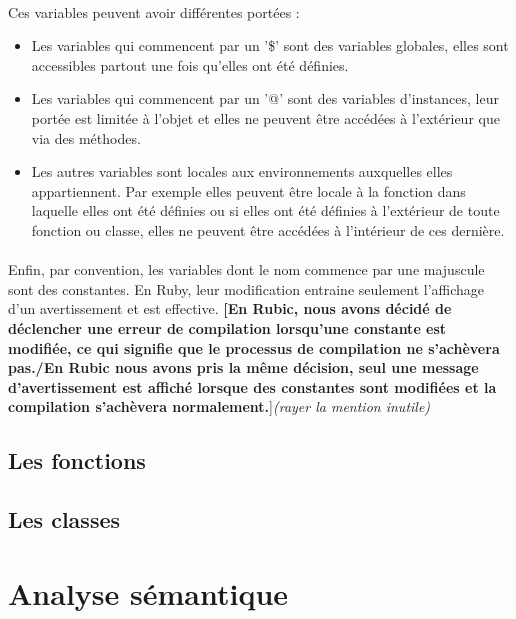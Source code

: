 \documentclass[12pt]{article}
\begin{document}
\paragraph{}
Ces variables peuvent avoir différentes portées :
\begin{itemize}
    \item Les variables qui commencent par un '\$' sont des variables
        globales, elles sont accessibles partout une fois qu'elles ont été
        définies.
    \item Les variables qui commencent par un '@' sont des variables
        d'instances, leur portée est limitée à l'objet et elles ne peuvent
        être accédées à l'extérieur que via des méthodes.
    \item Les autres variables sont locales aux environnements auxquelles
        elles appartiennent. Par exemple elles peuvent être locale à la
        fonction dans laquelle elles ont été définies ou si elles ont été
        définies à l'extérieur de toute fonction ou classe, elles ne peuvent
        être accédées à l'intérieur de ces dernière.
\end{itemize}

\paragraph{}
Enfin, par convention, les variables dont le nom commence par une majuscule
sont des constantes. En Ruby, leur modification entraine seulement l'affichage
d'un avertissement et est effective. \textbf{[En Rubic, nous avons décidé de
déclencher une erreur de compilation lorsqu'une constante est modifiée, ce qui
signifie que le processus de compilation ne s'achèvera pas.{\Large/}En
Rubic nous avons pris la même décision, seul une message d'avertissement est
affiché lorsque des constantes sont modifiées et la compilation s'achèvera
normalement.}]\emph{(rayer la mention inutile)}

\subsection{Les fonctions}

\subsection{Les classes}

\section{Analyse sémantique}
\end{document}
